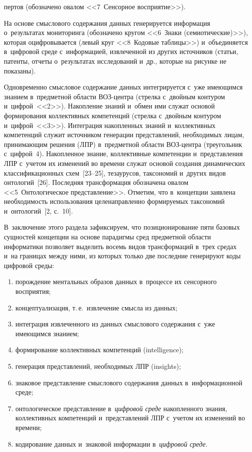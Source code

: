 \begin{multicols}{2}

\noindent
  пертов (обозначено овалом <<7~Сенсорное 
восприятие>>).

На основе смыслового содержания данных генерируется информация 
о~результатах мониторинга (обозначено кругом <<6~Знаки (семиотические)>>), 
которая оциф\-ро\-вы\-ва\-ет\-ся (левый круг <<8~Кодовые таблицы>>) и~объединяется 
в~циф\-ро\-вой среде с~информацией, извлеченной из других источников (статьи, 
патенты, отчеты о~результатах исследований и~др., которые на рисунке не 
показаны).

Одновременно смысловое содержание данных интегрируется с~уже имеющимся 
знанием в~предметной области ВОЗ-центра (стрелка с~двойным контуром 
и~циф\-рой~<<2>>). Накопление знаний и~обмен ими служат основой 
формирования коллективных компетенций (стрелка с~двойным контуром 
и~циф\-рой~<<3>>). Интеграция накопленных знаний и~коллективных 
компетенций служит источником генерации представлений, необходимых лицам, 
принимающим решения (ЛПР) в~предметной области ВОЗ-центра (треугольник 
с~циф\-рой~4). Накопленное знание, коллективные компетенции и~представления 
ЛПР с~учетом их изменений во времени служат основой создания динамических 
классификационных схем~[23--25], тезаурусов, таксономий и~других видов 
онтологий~[26]. Последняя трансформация обозначена овалом 
<<5~Онтологическое представление>>. Отметим, что в~концепции заявлена 
необходимость использования целе\-на\-прав\-лен\-но формируемых таксономий 
и~онтологий~[2, с.~10].

В~заключение этого раздела зафиксируем, что позиционирование пяти базовых 
сущностей концепции на основе парадигмы сред предметной области 
информатики позволяет выделить восемь видов трансформаций в~трех средах 
и~на границах между ними, из которых только две последние генерируют коды 
циф\-ро\-вой среды:
\begin{enumerate}[(1)]
\item порождение ментальных образов данных в~процессе их сенсорного 
восприятия;
\item концептуализация, т.\,е.\ извлечение смысла из данных;
\item интеграция извлеченного из данных смыслового содержания с~уже 
имеющимся знанием;
\item формирование коллективных компетенций (intelligence);
\item генерация представлений, необходимых ЛПР (insights);
\item знаковое представление смыслового содержания данных в~информационной 
среде;
\item онтологическое представление в~\textit{цифровой среде} накопленного 
знания, коллективных компетенций и~представлений ЛПР с~учетом их изменений 
во времени;
\item кодирование данных и~знаковой информации в~\textit{цифровой среде}.
\end{enumerate}


\end{multicols}
